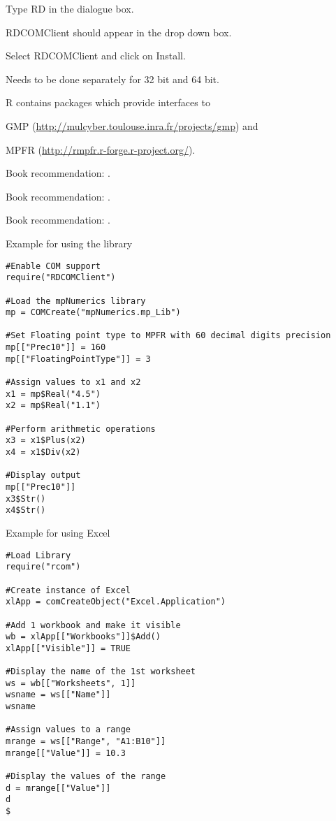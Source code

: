 Type RD in the dialogue box.

RDCOMClient should appear in the drop down box.

Select RDCOMClient and click on Install.

Needs to be done separately for 32 bit and 64 bit.

\vpara
R contains packages which provide interfaces to 

GMP (\href{http://mulcyber.toulouse.inra.fr/projects/gmp}{http://mulcyber.toulouse.inra.fr/projects/gmp}) and 

MPFR (\href{http://rmpfr.r-forge.r-project.org/}{http://rmpfr.r-forge.r-project.org/}). 

\vpara
Book recommendation: \cite{Adler2012}.

Book recommendation: \cite{Verzani2011}.

Book recommendation: \cite{Chang2012}.

\vpara
Example for using the library

\begin{lstlisting}
#Enable COM support
require("RDCOMClient")

#Load the mpNumerics library
mp = COMCreate("mpNumerics.mp_Lib")

#Set Floating point type to MPFR with 60 decimal digits precision
mp[["Prec10"]] = 160
mp[["FloatingPointType"]] = 3

#Assign values to x1 and x2
x1 = mp$Real("4.5")
x2 = mp$Real("1.1")

#Perform arithmetic operations
x3 = x1$Plus(x2)
x4 = x1$Div(x2)

#Display output
mp[["Prec10"]]
x3$Str()
x4$Str()
\end{lstlisting}

\vpara
Example for using Excel

\begin{lstlisting}
#Load Library
require("rcom")

#Create instance of Excel
xlApp = comCreateObject("Excel.Application")

#Add 1 workbook and make it visible
wb = xlApp[["Workbooks"]]$Add()
xlApp[["Visible"]] = TRUE

#Display the name of the 1st worksheet
ws = wb[["Worksheets", 1]]
wsname = ws[["Name"]]
wsname

#Assign values to a range
mrange = ws[["Range", "A1:B10"]]
mrange[["Value"]] = 10.3

#Display the values of the range
d = mrange[["Value"]]
d
$
\end{lstlisting}




